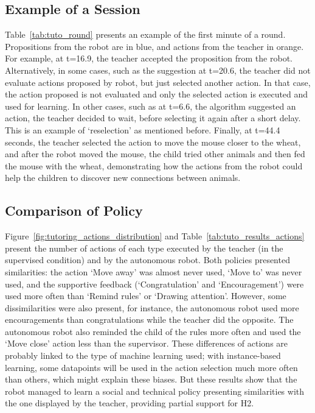 \subsection{Example of a Session}

Table~\ref{tab:tuto_round} presents an example of the first minute of a round. Propositions from the robot are in blue, and actions from the teacher in orange. For example, at t=16.9, the teacher accepted the proposition from the robot. Alternatively, in some cases, such as the suggestion at t=20.6, the teacher did not evaluate actions proposed by robot, but just selected another action. In that case, the action proposed is not evaluated and only the selected action is executed and used for learning. In other cases, such as at t=6.6, the algorithm suggested an action, the teacher decided to wait, before selecting it again after a short delay. This is an example of `reselection' as mentioned before. Finally, at t=44.4 seconds, the teacher selected the action to move the mouse closer to the wheat, and after the robot moved the mouse, the child tried other animals and then fed the mouse with the wheat, demonstrating how the actions from the robot could help the children to discover new connections between animals.


\subsection{Comparison of Policy}

Figure~\ref{fig:tutoring_actions_distribution} and Table~\ref{tab:tuto_results_actions} present the number of actions of each type executed by the teacher (in the supervised condition) and by the autonomous robot. Both policies presented similarities: the action `Move away' was almost never used, `Move to' was never used, and the supportive feedback (`Congratulation' and `Encouragement') were used more often than `Remind rules' or `Drawing attention'. However, some dissimilarities were also present, for instance, the autonomous robot used more encouragements than congratulations while the teacher did the opposite. The autonomous robot also reminded the child of the rules more often and used the `Move close' action less than the supervisor. These differences of actions are probably linked to the type of machine learning used; with instance-based learning, some datapoints will be used in the action selection much more often than others, which might explain these biases. But these results show that the robot managed to learn a social and technical policy presenting similarities with the one displayed by the teacher, providing partial support for H2.


